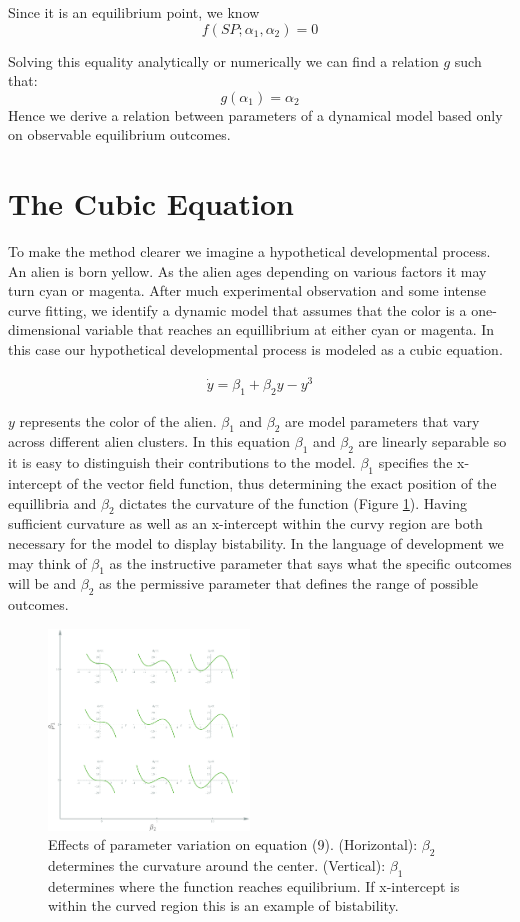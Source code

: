 \documentclass[letterpaper]{article}
\begin{document}
Since it is an equilibrium point, we know 
\[
  f(SP; \alpha_1,\alpha_2) = 0
\]

Solving this equality analytically or numerically we can find a relation $g$
such that:
\[
  g(\alpha_1) = \alpha_2
  \]
Hence we derive a relation between parameters of a dynamical model based only on 
observable equilibrium outcomes.

\section{The Cubic Equation}
To make the method clearer we imagine a hypothetical developmental
process. An alien is born yellow. As the alien ages depending
on various factors it may turn cyan or magenta. After much experimental observation
and some intense curve fitting, we identify a dynamic
model that assumes that the color is a one-dimensional variable that reaches 
an equillibrium at either cyan or magenta. In this case our hypothetical developmental
process is modeled as a cubic equation.

\begin{eqnarray}
    \dot{y} = \beta_1 + \beta_2 y - y^3
\end{eqnarray}

$y$ represents the color of the alien. $\beta_1$ and $\beta_2$ are model 
parameters that vary across different alien clusters. In this equation $\beta_1$ and
$\beta_2$ are linearly separable so it is easy to distinguish their contributions 
to the model. $\beta_1$ specifies the x-intercept of the vector field function,
thus determining the exact position of the equillibria and $\beta_2$ dictates the 
curvature of the function (Figure \ref{cubic_params}). 
Having sufficient curvature as well as an x-intercept
within the curvy region are both necessary for the model to display bistability.
In the language of development we may think of $\beta_1$ as the instructive parameter 
that says what the
specific outcomes will be and $\beta_2$ as the permissive parameter that defines the
range of possible outcomes.

\begin{figure}[t]
\begin{center}
\includegraphics[width=2.1in,angle=0]{./cubic_params.png}
\caption{Effects of parameter variation on equation (9). 
(Horizontal): $\beta_2$ determines the curvature around the 
center.
(Vertical): $\beta_1$ determines where the function reaches equilibrium.
If x-intercept is within the curved region this is an example of bistability.}
\label{cubic_params}
\end{center}
\end{figure}
\end{document}
